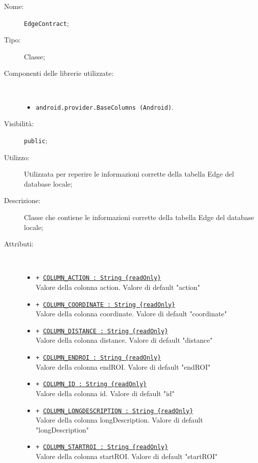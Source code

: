 \documentclass[../DefinizioneDiProdotto.tex]{subfiles}
\begin{document}
\begin{description}
	\item[Nome:] \texttt{EdgeContract};
	\item[Tipo:] Classe;
	\item[Componenti delle librerie utilizzate:] \
	\begin{itemize}
		\item \texttt{android.provider.BaseColumns (Android)}.
		
	\end{itemize}
	\item[Visibilità:] \texttt{public};
	\item[Utilizzo:] Utilizzata per reperire le informazioni corrette della tabella Edge del database locale;
	\item[Descrizione:] Classe che contiene le informazioni corrette della tabella Edge del database locale;
	\item[Attributi:] \
	\begin{itemize}
		\item \texttt{+ \underline{COLUMN\_ACTION : String \{readOnly\}}}\\
		Valore della colonna action. Valore di default "action"
		
		\item \texttt{+ \underline{COLUMN\_COORDINATE : String \{readOnly\}}}\\
		Valore della colonna coordinate. Valore di default "coordinate"
		
		\item \texttt{+ \underline{COLUMN\_DISTANCE : String \{readOnly\}}}\\
		Valore della colonna distance. Valore di default "distance"
		
		\item \texttt{+ \underline{COLUMN\_ENDROI : String \{readOnly\}}}\\
		Valore della colonna endROI. Valore di default "endROI"
		
		\item \texttt{+ \underline{COLUMN\_ID : String \{readOnly\}}}\\
		Valore della colonna id. Valore di default "id"
		
		\item \texttt{+ \underline{COLUMN\_LONGDESCRIPTION : String \{readOnly\}}}\\
		Valore della colonna longDescription. Valore di default "longDescription"
		
		\item \texttt{+ \underline{COLUMN\_STARTROI : String \{readOnly\}}}\\
		Valore della colonna startROI. Valore di default "startROI"
		

\end{itemize}
\end{description}
\end{document}
